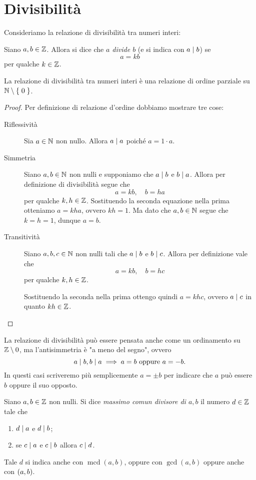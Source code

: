 \section{Divisibilità}

Consideriamo la relazione di divisibilità tra numeri interi:
\begin{definition}
    [Divisibilità]
    Siano $a, b \in \mathbb{Z}$. Allora si dice che \emph{$a$ divide $b$} (e si indica con $a \mid b$) se \[
        a = kb
    \] per qualche $k \in \mathbb{Z}$.
\end{definition}

\begin{proposition}
    La relazione di divisibilità tra numeri interi è una relazione di ordine parziale su $\mathbb{N} \setminus \left\{\;0\;\right\}$.
\end{proposition}
\begin{proof}
    Per definizione di relazione d'ordine dobbiamo mostrare tre cose:
    \begin{description}
        \item[Riflessività] Sia $a \in \mathbb{N}$ non nullo. Allora $a \mid a$ poiché $a = 1\cdot a$.
        \item[Simmetria] Siano $a, b \in \mathbb{N}$ non nulli e supponiamo che $a \mid b$ e $b \mid a$. Allora per definizione di divisibilità segue che \[
            a = kb, \quad b = ha    
        \]  per qualche $k, h \in \mathbb{Z}$. Sostituendo la seconda equazione nella prima otteniamo $a = kha$, ovvero $kh = 1$. Ma dato che $a, b \in \mathbb{N}$ segue che $k = h = 1$, dunque $a = b$.
        \item[Transitività] Siano $a, b, c \in \mathbb{N}$ non nulli tali che $a \mid b$ e $b \mid c$. Allora per definizione vale che \[
            a = kb, \quad b = hc    
        \] per qualche $k, h \in \mathbb{Z}$.

        Sostituendo la seconda nella prima ottengo quindi $a = khc$, ovvero $a \mid c$ in quanto $kh \in \mathbb{Z}$.
    \end{description}
\end{proof}

La relazione di divisibilità può essere pensata anche come un ordinamento su $\mathbb{Z} \setminus {0}$, ma l'antisimmetria è "a meno del segno", ovvero \[
    a \mid b, b \mid a \implies a = b \text{ oppure } a = -b.
\] In questi casi scriveremo più semplicemente $a = \pm b$ per indicare che $a$ può essere $b$ oppure il suo opposto.

\begin{definition}
    Siano $a, b \in \mathbb{Z}$ non nulli. Si dice \emph{massimo comun divisore di $a,b$} il numero $d \in \mathbb{Z}$ tale che \begin{enumerate}[label={(\roman*)}]
        \item $d \mid a$ e $d \mid b$;
        \item se $c \mid a$ e $c \mid b$ allora $c \mid d$.
    \end{enumerate}

    Tale $d$ si indica anche con $\operatorname{mcd}(a, b)$, oppure con $\gcd(a, b)$ oppure anche con $\left(a, b\right)$.
\end{definition}

